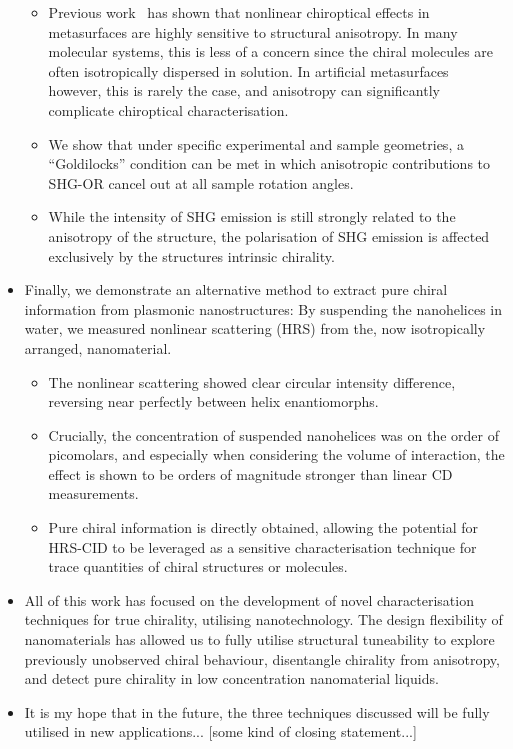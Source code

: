 \begin{itemize}
    \begin{itemize}
        \item Previous work~\cite{Hooper2017} has shown that nonlinear chiroptical effects in metasurfaces are highly sensitive to structural anisotropy. In many molecular systems, this is less of a concern since the chiral molecules are often isotropically dispersed in solution. In artificial metasurfaces however, this is rarely the case, and anisotropy can significantly complicate chiroptical characterisation.
        \item We show that under specific experimental and sample geometries, a ``Goldilocks'' condition can be met in which anisotropic contributions to SHG-OR cancel out at all sample rotation angles. 
        \item While the intensity of SHG emission is still strongly related to the anisotropy of the structure, the polarisation of SHG emission is affected exclusively by the structures intrinsic chirality.
    \end{itemize}
    \item Finally, we demonstrate an alternative method to extract pure chiral information from plasmonic nanostructures: By suspending the nanohelices in water, we measured nonlinear scattering (HRS) from the, now isotropically arranged, nanomaterial.
    \begin{itemize}
        \item The nonlinear scattering showed clear circular intensity difference, reversing near perfectly between helix enantiomorphs.
        \item Crucially, the concentration of suspended nanohelices was on the order of picomolars, and especially when considering the volume of interaction, the effect is shown to be orders of magnitude stronger than linear CD measurements.
        \item Pure chiral information is directly obtained, allowing the potential for HRS-CID to be leveraged as a sensitive characterisation technique for trace quantities of chiral structures or molecules.
    \end{itemize}
    
    \item All of this work has focused on the development of novel characterisation techniques for true chirality, utilising nanotechnology. The design flexibility of nanomaterials has allowed us to fully utilise structural tuneability to explore previously unobserved chiral behaviour, disentangle chirality from anisotropy, and detect pure chirality in low concentration nanomaterial liquids.

    \item It is my hope that in the future, the three techniques discussed will be fully utilised in new applications... [some kind of closing statement...]

\end{itemize}
\color{black}